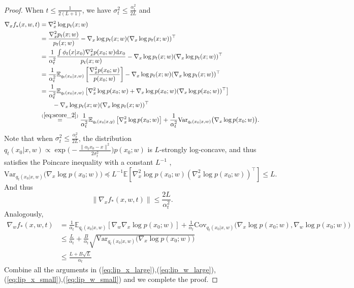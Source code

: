 \documentclass{article}
\numberwithin{equation}{section}
\def\eqref#1{equation~\ref{#1}}
\newcommand{\E}{\mathbb{E}}
\newcommand{\Var}{\mathrm{Var}}
\newcommand{\Cov}{\mathrm{Cov}}
\newcommand{\dif}{\mathrm{d}}
\theoremstyle{definition}
\renewcommand{\eqref}[1]{(\ref{#1})}
\begin{document}
\begin{proof}
    When $t\leq\frac{1}{2(L+1)}$, we have $\sigma_t^2\leq \frac{\alpha_t^2}{2L}$ and
    \begin{equation}
        \begin{aligned}
            \nabla_xf_*(x,w,t)
            &=\nabla_x^2\log p_t(x;w) \\
            &= \frac{\nabla_x^2 p_t(x;w)}{p_t(x;w)} - \nabla_x\log p_t(x;w)(\nabla_x\log p_t(x;w))^\top \\
            &=\frac{1}{\alpha_t^2} \frac{\int \phi_t(x|x_0)\nabla_x^2p(x_0;w)\dif x_0}{p_t(x;w)} - \nabla_x\log p_t(x;w)(\nabla_x\log p_t(x;w))^\top \\
            &= \frac{1}{\alpha_t^2} \E_{q_t(x_0|x,w)}\left[\frac{\nabla_x^2p(x_0;w)}{p(x_0;w)}\right] - \nabla_x\log p_t(x;w)(\nabla_x\log p_t(x;w))^\top \\
            &= \frac{1}{\alpha_t^2} \E_{q_t(x_0|x,w)}\left[\nabla_x^2\log p(x_0;w)+\nabla_x\log p(x_0;w)(\nabla_x\log p(x_0;w))^\top\right] \\
            &\qquad - \nabla_x\log p_t(x;w)(\nabla_x\log p_t(x;w))^\top \\
            &\overset{\eqref{eq:score_2}}{=} \frac{1}{\alpha_t^2} \E_{q_t(x_0|x,y)}\left[\nabla_x^2\log p(x_0;w)\right] + \frac{1}{\alpha_t^2}\Var_{q_t(x_0|x,w)}\big(\nabla_x\log p(x_0;w)\big).
        \end{aligned}
    \end{equation}
    Note that when $\sigma_t^2\leq \frac{\alpha_t^2}{2L}$, the distribution $q_t(x_0|x,w)\propto \exp\big(-\frac{\|\alpha_tx_0-x\|^2}{2\sigma_t^2}\big)p(x_0;w)$ is $L$-strongly log-concave, and thus satisfies the Poincare inequality with a constant $L^{-1}$ \citep{chen2023improved},
    \begin{equation}
        \Var_{q_t(x_0|x,w)}\big(\nabla_x\log p(x_0;w)\big)\preceq L^{-1} \E \left[\nabla_x^2\log p(x_0;w) (\nabla_x^2\log p(x_0;w))^\top\right] \leq L.
    \end{equation}
    And thus
    \begin{equation}\label{eq:lip_x_small}
        \|\nabla_xf_*(x,w,t)\|\leq \frac{2L}{\alpha_t^2}.
    \end{equation}
    Analogously,
    \begin{equation}\label{eq:lip_w_small}
        \begin{aligned}
            \nabla_wf_*(x,w,t)
            &= \frac{1}{\alpha_t} \E_{q_t(x_0|x,w)}\left[\nabla_w\nabla_x\log p(x_0;w)\right] + \frac{1}{\alpha_t} \Cov_{q_t(x_0|x,w)}\big(\nabla_x\log p(x_0;w), \nabla_w\log p(x_0;w)\big) \\
            &\leq \frac{L}{\alpha_t} + \frac{B}{\alpha_t}\sqrt{\Var_{q_t(x_0|x,w)}\big(\nabla_x\log p(x_0;w)\big)} \\
            &\leq \frac{L+B\sqrt{L}}{\alpha_t}
        \end{aligned}
    \end{equation}
    Combine all the arguments in \eqref{eq:lip_x_large},\eqref{eq:lip_w_large},\eqref{eq:lip_x_small},\eqref{eq:lip_w_small} and we complete the proof.
\end{proof}
\end{document}
